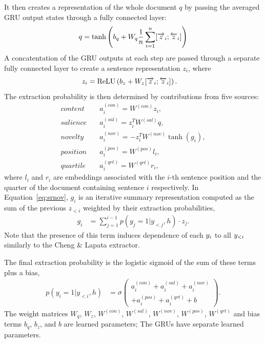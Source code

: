 {It then creates a representation
of the whole document $q$ by passing the averaged GRU output states through
a fully connected layer: 
\begin{align}
q = \tanh\left(b_q + W_q\frac{1}{n}\sum_{i=1}^{n} [\overrightarrow{z}_i; \overleftarrow{z}_i] \right)
\end{align}
A concatentation of the GRU outputs at each step
are passed through a separate fully connected layer to create a 
sentence representation $z_i$, where
\begin{align}
    z_i &= \operatorname{ReLU}\left(b_z + W_z [\overrightarrow{z}_i; \overleftarrow{z}_i]\right).
\end{align}
The extraction probability is then determined by contributions from five 
sources:
\begin{align}
    \textit{content} &\quad a^{(con)}_i=W^{(con)} z_i, \\
    \textit{salience}&\quad a^{(sal)}_i = z_i^TW^{(sal)} q, \\
    \textit{novelty}&\quad a^{(nov)}_i = -z_i^TW^{(nov)} \tanh(g_i), \label{eq:srnov} \\
    \textit{position}&\quad a^{(pos)}_i = W^{(pos)} l_i, \\
    \textit{quartile}&\quad a^{(qrt)}_i = W^{(qrt)} r_i,
\end{align}
where $l_i$ and $r_i$ are embeddings associated with the $i$-th sentence
position and the quarter of the document containing sentence $i$ respectively.
In Equation~\ref{eq:srnov}, $g_i$ is an iterative summary representation 
computed as the
sum of the previous $z_{<i}$ weighted by their extraction probabilities,
\begin{align}
g_i & = \sum_{j=1}^{i-1} p(y_j=1|y_{<j},h) \cdot z_j.
\end{align}
Note that the presence of this term induces dependence of each 
$\slabel_i$ to 
all $\slabel_{<i}$ similarly to the Cheng \& Lapata extractor.

The final extraction probability is the logistic sigmoid of the
sum of these terms plus a bias,
\begin{align}
    p(y_i=1|y_{<i}, h) &= \sigma\left(\begin{array}{l}
      a_i^{(con)} + a_i^{(sal)} + a_i^{(nov)} \\
  + a_i^{(pos)}  + a_i^{(qrt)} + b \end{array}\right).
\end{align}
The weight matrices $W_q$, $W_z$, $W^{(con)}$, $W^{(sal)}$, $W^{(nov)}$, $W^{(pos)}$,
$W^{(qrt)}$ and bias terms $b_q$, $b_z$, and $b$ are learned parameters;
The GRUs have separate learned parameters.

}
